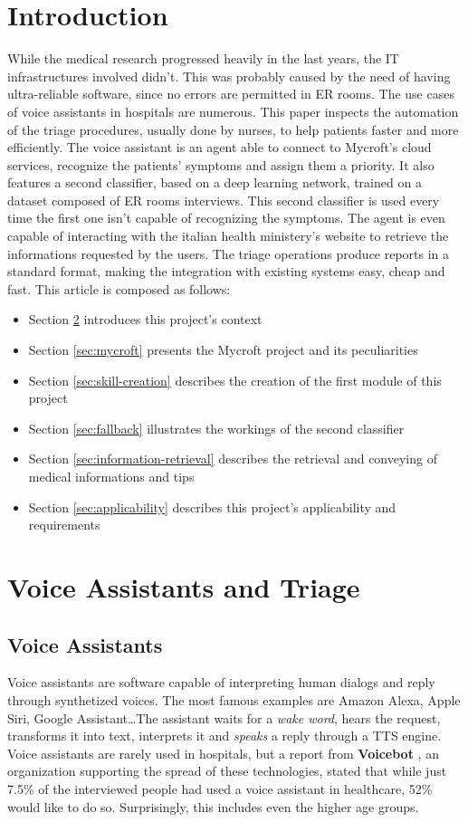 \documentclass[conference]{IEEEtran}
\begin{document}
\section{Introduction}
While the medical research progressed heavily in the last years, the IT infrastructures involved didn't. This was probably caused by the need of having ultra-reliable software, since no errors are permitted in ER rooms. The use cases of voice assistants in hospitals are numerous. This paper inspects the automation of the triage procedures, usually done by nurses, to help patients faster and more efficiently. The voice assistant is an agent able to connect to Mycroft's cloud services, recognize the patients' symptoms and assign them a priority. It also features a second classifier, based on a deep learning network, trained on a dataset composed of ER rooms interviews. This second classifier is used every time the first one isn't capable of recognizing the symptoms. The agent is even capable of interacting with the italian health ministery's website to retrieve the informations requested by the users. The triage operations produce reports in a standard format, making the integration with existing systems easy, cheap and fast. This article is composed as follows:
\begin{itemize}
    \item Section \ref{sec:voice-assistants-and-triage} introduces this project's context
    \item Section \ref{sec:mycroft} presents the Mycroft project and its peculiarities
    \item Section \ref{sec:skill-creation} describes the creation of the first module of this project
    \item Section \ref{sec:fallback} illustrates the workings of the second classifier
    \item Section \ref{sec:information-retrieval} describes the retrieval and conveying of medical informations and tips
    \item Section \ref{sec:applicability} describes this project's applicability and requirements
\end{itemize}

\section{Voice Assistants and Triage}
\label{sec:voice-assistants-and-triage}
\subsection{Voice Assistants}
Voice assistants are software capable of interpreting human dialogs and reply through synthetized voices. The most famous examples are Amazon Alexa, Apple Siri, Google Assistant\dots The assistant waits for a \textit{wake word}, hears the request, transforms it into text, interprets it and \textit{speaks} a reply through a TTS engine. Voice assistants are rarely used in hospitals, but a report from \textbf{Voicebot} \cite{voicebot}, an organization supporting the spread of these technologies, stated that while just 7.5\% of the interviewed people had used a voice assistant in healthcare, 52\% would like to do so. Surprisingly, this includes even the higher age groups.
\end{document}
